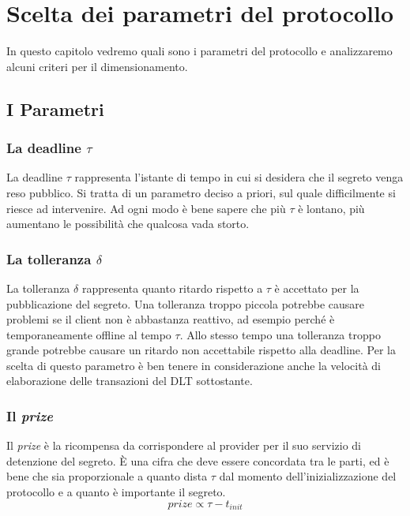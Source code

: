 \chapter{Scelta dei parametri del protocollo}
\label{chap:dimensionamento}

In questo capitolo vedremo quali sono i parametri del protocollo
e analizzaremo alcuni criteri per il dimensionamento.

\section{I Parametri}

\subsection{La deadline $ \tau $}
La deadline $ \tau $ rappresenta l'istante di tempo in cui
si desidera che il segreto venga reso pubblico.
Si tratta di un parametro deciso a priori, sul quale difficilmente si riesce ad
intervenire. Ad ogni modo è bene sapere che più $ \tau $ è lontano, più aumentano
le possibilità che qualcosa vada storto.

\subsection{La tolleranza $ \delta $}
La tolleranza $ \delta $ rappresenta quanto ritardo rispetto a $ \tau $ è
accettato per la pubblicazione del segreto. Una tolleranza troppo
piccola potrebbe causare problemi se il client non è abbastanza reattivo,
ad esempio perché è
temporaneamente offline al tempo $ \tau $.
Allo stesso tempo una tolleranza
troppo grande potrebbe causare un ritardo non accettabile rispetto alla deadline.
Per la scelta di questo parametro è ben tenere in considerazione anche
la velocità di elaborazione delle transazioni
del DLT sottostante.

\subsection{Il \textit{prize}}
Il \textit{prize} è la ricompensa da corrispondere al provider per il suo servizio
di detenzione del segreto. È una cifra che deve essere concordata tra le parti,
ed è bene che sia proporzionale a quanto dista $ \tau $ dal momento
dell'inizializzazione del protocollo
e a quanto è importante il segreto.
$$ \textit{prize} \propto \tau - t_{init} $$

